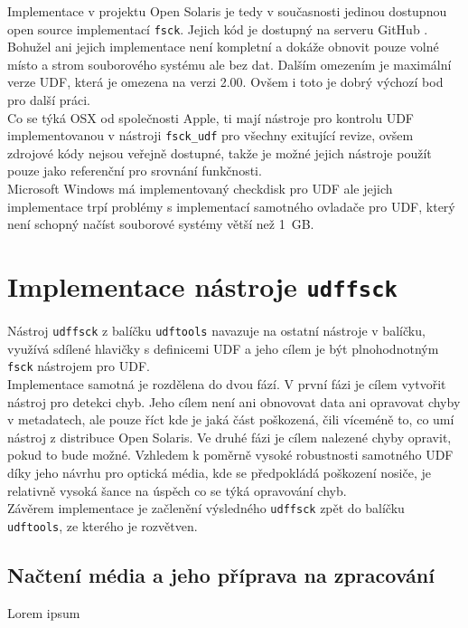 Implementace v projektu Open Solaris je tedy v současnosti jedinou dostupnou open source implementací \texttt{fsck}. Jejich kód je dostupný na serveru GitHub \cite{solaris-github}. Bohužel ani jejich implementace není kompletní a dokáže obnovit pouze volné místo a strom souborového systému ale bez dat. Dalším omezením je maximální verze UDF, která je omezena na verzi 2.00. Ovšem i toto je dobrý výchozí bod pro další práci.\\ 
Co se týká OSX od společnosti Apple, ti mají nástroje pro kontrolu UDF implementovanou v nástroji \texttt{fsck\_udf} pro všechny exitující revize, ovšem zdrojové kódy nejsou veřejně dostupné, takže je možné jejich nástroje použít pouze jako referenční pro srovnání funkčnosti.\\
Microsoft Windows má implementovaný checkdisk pro UDF ale jejich implementace trpí problémy s implementací samotného ovladače pro UDF, který není schopný načíst souborové systémy větší než 1~GB.\\

\section{Implementace nástroje \texttt{udffsck}}
Nástroj \texttt{udffsck} z balíčku \texttt{udftools} navazuje na ostatní nástroje v balíčku, využívá sdílené hlavičky s definicemi UDF a jeho cílem je být plnohodnotným \texttt{fsck} nástrojem pro UDF.\\
Implementace samotná je rozdělena do dvou fází. V první fázi je cílem vytvořit nástroj pro detekci chyb. Jeho cílem není ani obnovovat data ani opravovat chyby v metadatech, ale pouze říct kde je jaká část poškozená, čili víceméně to, co umí nástroj z distribuce Open Solaris. Ve druhé fázi je cílem nalezené chyby opravit, pokud to bude možné. Vzhledem k poměrně vysoké robustnosti samotného UDF díky jeho návrhu pro optická média, kde se předpokládá poškození nosiče, je relativně vysoká šance na úspěch co se týká opravování chyb.\\
Závěrem implementace je začlenění výsledného \texttt{udffsck} zpět do balíčku \texttt{udftools}, ze kterého je rozvětven. 

\subsection{Načtení média a jeho příprava na zpracování}
Lorem ipsum


